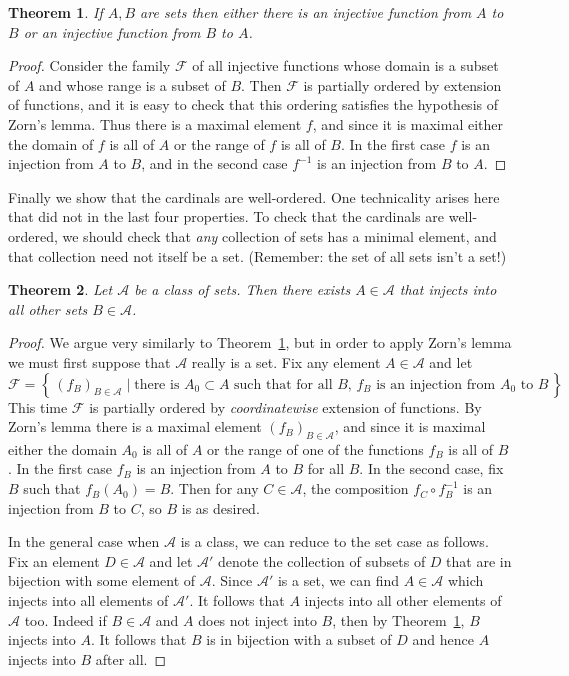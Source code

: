 \documentclass[11pt,oneside]{amsbook}
\newcommand{\set}[1]{\left\{\,#1\,\right\}}
\theoremstyle{definition}
\theoremstyle{plain}
\newtheorem{thm}{Theorem}[section]
\theoremstyle{definition}
\theoremstyle{remark}
\numberwithin{equation}{section}
\numberwithin{figure}{section}
\begin{document}
\begin{thm}
  \label{thm:card-total}
  If $A,B$ are sets then either there is an injective function from $A$ to $B$ or an injective function from $B$ to $A$.
\end{thm}

\begin{proof}
  Consider the family $\mathcal F$ of all injective functions whose domain is a subset of $A$ and whose range is a subset of $B$. Then $\mathcal F$ is partially ordered by extension of functions, and it is easy to check that this ordering satisfies the hypothesis of Zorn's lemma. Thus there is a maximal element $f$, and since it is maximal either the domain of $f$ is all of $A$ or the range of $f$ is all of $B$. In the first case $f$ is an injection from $A$ to $B$, and in the second case $f^{-1}$ is an injection from $B$ to $A$.
\end{proof}

Finally we show that the cardinals are well-ordered. One technicality arises here that did not in the last four properties. To check that the cardinals are well-ordered, we should check that \emph{any} collection of sets has a minimal element, and that collection need not itself be a set. (Remember: the set of all sets isn't a set!)

\begin{thm}
  \label{thm:card-well}
  Let $\mathcal A$ be a class of sets. Then there exists $A\in\mathcal A$ that injects into all other sets $B\in\mathcal A$.
\end{thm}

\begin{proof}
  We argue very similarly to Theorem~\ref{thm:card-total}, but in order to apply Zorn's lemma we must first suppose that $\mathcal A$ really is a set. Fix any element $A\in\mathcal A$ and let
\[\mathcal F=\set{(f_B)_{B\in\mathcal A}\mid\text{there is $A_0\subset A$ such that for all $B$, $f_B$ is an injection from $A_0$ to $B$}}
\]
This time $\mathcal F$ is partially ordered by \emph{coordinatewise} extension of functions. By Zorn's lemma there is a maximal element $(f_B)_{B\in\mathcal A}$, and since it is maximal either the domain $A_0$ is all of $A$ or the range of one of the functions $f_B$ is all of $B$. In the first case $f_B$ is an injection from $A$ to $B$ for all $B$. In the second case, fix $B$ such that $f_B(A_0)=B$. Then for any $C\in\mathcal A$, the composition $f_C\circ f_B^{-1}$ is an injection from $B$ to $C$, so $B$ is as desired.

In the general case when $\mathcal A$ is a class, we can reduce to the set case as follows. Fix an element $D\in\mathcal A$ and let $\mathcal A'$ denote the collection of subsets of $D$ that are in bijection with some element of $\mathcal A$. Since $\mathcal A'$ is a set, we can find $A\in\mathcal A$ which injects into all elements of $\mathcal A'$. It follows that $A$ injects into all other elements of $\mathcal A$ too. Indeed if $B\in\mathcal A$ and $A$ does not inject into $B$, then by Theorem~\ref{thm:card-total}, $B$ injects into $A$. It follows that $B$ is in bijection with a subset of $D$ and hence $A$ injects into $B$ after all.
\end{proof}
\end{document}
